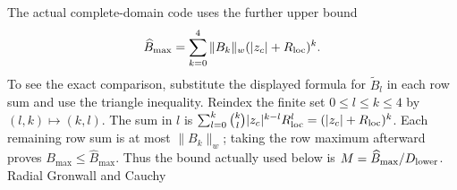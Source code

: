 The actual complete-domain code uses the further upper bound
\[
 \widehat B_{\max}=\sum_{k=0}^4\|B_k\|_w
                           (|z_c|+R_{\rm loc})^k.
\]
To see the exact comparison, substitute the displayed formula for
$\widetilde B_l$ in each row sum and use the triangle inequality.
Reindex the finite set $0\le l\le k\le4$ by $(l,k)\mapsto(k,l)$.
The sum in $l$ is
$\sum_{l=0}^k\binom kl|z_c|^{k-l}R_{\rm loc}^l
=(|z_c|+R_{\rm loc})^k$.
Each remaining row sum is at most $\|B_k\|_w$; taking the row
maximum afterward proves $B_{\max}\le\widehat B_{\max}$.
Thus the bound actually used below is
$M=\widehat B_{\max}/D_{\rm lower}$. Radial Gronwall and Cauchy

